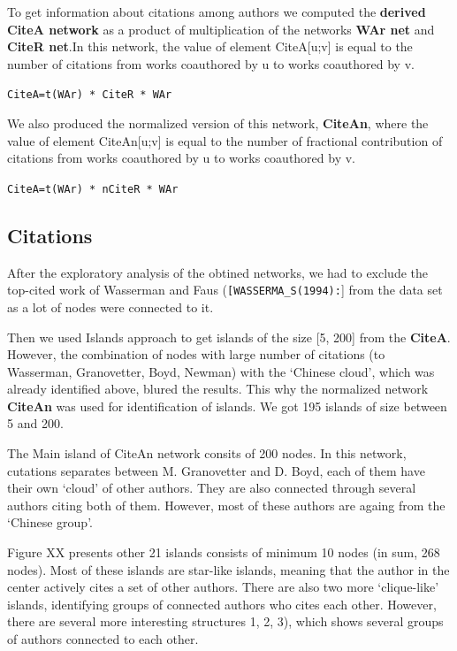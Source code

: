 \documentclass[11pt]{article} %
\begin{document}
To get information about citations among authors we computed the \textbf{derived CiteA network} as a product of multiplication of the networks \textbf{WAr net} and \textbf{CiteR net}.In this network, the value of element CiteA[u;v] is equal to the number of citations from works coauthored by u to works coauthored by v.

\texttt{CiteA=t(WAr) * CiteR * WAr}

We also produced the normalized version of this network, \textbf{CiteAn}, where the value of element CiteAn[u;v] is equal to the number of {fractional} contribution of citations from works coauthored by u to works coauthored by v.\medskip 

\texttt{CiteA=t(WAr) * nCiteR * WAr}

\subsection{Citations} 

After the exploratory analysis of the obtined networks, we had to exclude the top-cited work of Wasserman and Faus (\texttt{[WASSERMA\_S(1994):}] from the data set as a lot of nodes were connected to it. \medskip 

Then we used Islands approach to get islands of the size [5, 200] from the \textbf{CiteA}. However, the combination of nodes with large number of citations (to Wasserman, Granovetter, Boyd, Newman) with the `Chinese cloud', which was already identified above, blured the results. This why the normalized network \textbf{CiteAn} was used for identification of islands. We got 195 islands of size between 5 and 200. \medskip 

The Main island of CiteAn network consits of 200 nodes. In this network, cutations separates between M. Granovetter and D. Boyd, each of them have their own `cloud' of other authors. They are also connected through several authors citing both of them. However, most of these authors are againg from the `Chinese group'.  \medskip  


Figure XX presents other 21 islands consists of minimum 10 nodes (in sum, 268 nodes). Most of these islands are star-like islands, meaning that the author in the center actively cites a set of other authors. There are also two more `clique-like' islands, identifying groups of connected authors who cites each other. However, there are several more interesting structures 1, 2, 3), which shows several groups of authors connected to each other. \medskip  
\end{document}
